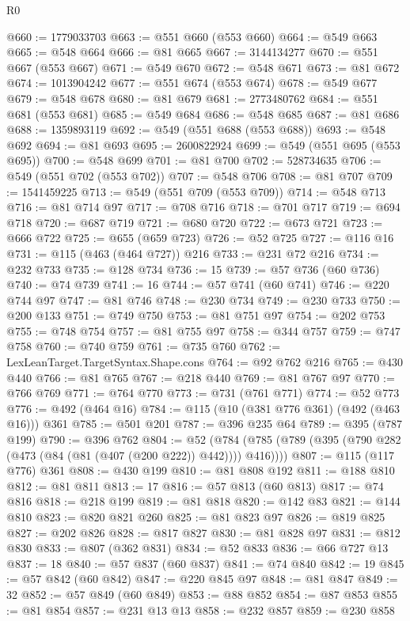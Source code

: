 \begin{lexlean}{R0}
\begin{coremodule}
@660 := 1779033703
@663 := @551 @660 (@553 @660)
@664 := @549 @663
@665 := @548 @664
@666 := @81 @665
@667 := 3144134277
@670 := @551 @667 (@553 @667)
@671 := @549 @670
@672 := @548 @671
@673 := @81 @672
@674 := 1013904242
@677 := @551 @674 (@553 @674)
@678 := @549 @677
@679 := @548 @678
@680 := @81 @679
@681 := 2773480762
@684 := @551 @681 (@553 @681)
@685 := @549 @684
@686 := @548 @685
@687 := @81 @686
@688 := 1359893119
@692 := @549 (@551 @688 (@553 @688))
@693 := @548 @692
@694 := @81 @693
@695 := 2600822924
@699 := @549 (@551 @695 (@553 @695))
@700 := @548 @699
@701 := @81 @700
@702 := 528734635
@706 := @549 (@551 @702 (@553 @702))
@707 := @548 @706
@708 := @81 @707
@709 := 1541459225
@713 := @549 (@551 @709 (@553 @709))
@714 := @548 @713
@716 := @81 @714 @97
@717 := @708 @716
@718 := @701 @717
@719 := @694 @718
@720 := @687 @719
@721 := @680 @720
@722 := @673 @721
@723 := @666 @722
@725 := @655 (@659 @723)
@726 := @52 @725
@727 := @116 @16
@731 := @115 (@463 (@464 @727)) @216
@733 := @231 @72 @216
@734 := @232 @733
@735 := @128 @734
@736 := 15
@739 := @57 @736 (@60 @736)
@740 := @74 @739
@741 := 16
@744 := @57 @741 (@60 @741)
@746 := @220 @744 @97
@747 := @81 @746
@748 := @230 @734
@749 := @230 @733
@750 := @200 @133
@751 := @749 @750
@753 := @81 @751 @97
@754 := @202 @753
@755 := @748 @754
@757 := @81 @755 @97
@758 := @344 @757
@759 := @747 @758
@760 := @740 @759
@761 := @735 @760
@762 := LexLeanTarget.TargetSyntax.Shape.cons
@764 := @92 @762 @216
@765 := @430 @440
@766 := @81 @765
@767 := @218 @440
@769 := @81 @767 @97
@770 := @766 @769
@771 := @764 @770
@773 := @731 (@761 @771)
@774 := @52 @773
@776 := @492 (@464 @16)
@784 := @115 (@10 (@381 @776 @361) (@492 (@463 @16))) @361
@785 := @501 @201
@787 := @396 @235 @64
@789 := @395 (@787 @199)
@790 := @396 @762
@804 := @52 (@784 (@785 (@789 (@395 (@790 @282 (@473 (@84 (@81 (@407 (@200 @222)) @442)))) @416))))
@807 := @115 (@117 @776) @361
@808 := @430 @199
@810 := @81 @808 @192
@811 := @188 @810
@812 := @81 @811
@813 := 17
@816 := @57 @813 (@60 @813)
@817 := @74 @816
@818 := @218 @199
@819 := @81 @818
@820 := @142 @83
@821 := @144 @810
@823 := @820 @821 @260
@825 := @81 @823 @97
@826 := @819 @825
@827 := @202 @826
@828 := @817 @827
@830 := @81 @828 @97
@831 := @812 @830
@833 := @807 (@362 @831)
@834 := @52 @833
@836 := @66 @727 @13
@837 := 18
@840 := @57 @837 (@60 @837)
@841 := @74 @840
@842 := 19
@845 := @57 @842 (@60 @842)
@847 := @220 @845 @97
@848 := @81 @847
@849 := 32
@852 := @57 @849 (@60 @849)
@853 := @88 @852
@854 := @87 @853
@855 := @81 @854
@857 := @231 @13 @13
@858 := @232 @857
@859 := @230 @858

\end{coremodule}
\end{lexlean}
